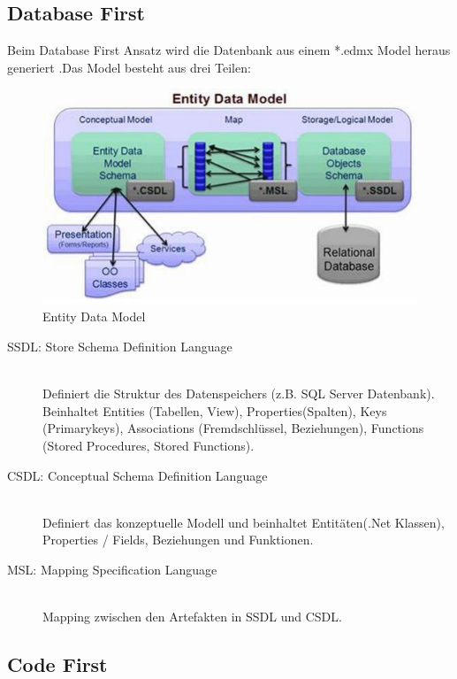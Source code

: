 \documentclass[
a4paper,
oneside,
10pt,
fleqn,
headsepline,
toc=listofnumbered, 
bibliography=totocnumbered]{scrartcl}
\begin{document}
\subsection{Database First}
Beim Database First Ansatz wird die Datenbank aus einem *.edmx Model heraus generiert .Das Model besteht aus drei Teilen:
\begin{figure}[h]
	\centering
	\includegraphics[width=0.7\linewidth]{images/entity_data_model}
	\caption{Entity Data Model}
	\label{fig:entitydatamodel}
\end{figure}
\begin{description}
	\item[SSDL: Store Schema Definition Language] \hfill \\
	Definiert die Struktur des Datenspeichers (z.B. SQL Server Datenbank). Beinhaltet Entities (Tabellen, View), Properties(Spalten), Keys (Primarykeys), Associations (Fremdschlüssel, Beziehungen), Functions (Stored Procedures, Stored Functions). 
	\item[CSDL: Conceptual Schema Definition Language] \hfill \\
	Definiert das konzeptuelle Modell und beinhaltet Entitäten(.Net Klassen), Properties / Fields, Beziehungen und Funktionen. 
	\item[MSL: Mapping Specification Language] \hfill \\ 
	Mapping zwischen den Artefakten in SSDL und CSDL.  
\end{description}

\subsection{Code First}
\end{document}
